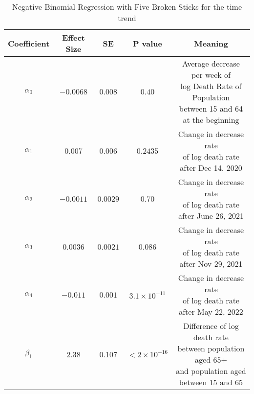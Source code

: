 \documentclass[12pt]{article}
\begin{document}
\begin{enumerate}[(a)]
	
	\begin{table}[htbp]
		\centering
		\begin{tabular}{ccccc}
			\toprule
			Coefficient & Effect Size & SE & P value & Meaning\\
			\midrule
			$\alpha_{0}$ & $-0.0068$ & $0.008$ & $0.40$ & \makecell{Average decrease per week of \\ log Death Rate of  Population \\ between 15 and 64 \\ at the beginning}\\
			\addlinespace[0.3cm]
			$\alpha_{1}$ & $0.007$ & $0.006$ & $0.2435$& \makecell{Change in decrease rate \\ of log death rate\\ after Dec 14, 2020}\\
			\addlinespace[0.3cm]
			$\alpha_{2}$ & $-0.0011$ & $0.0029$ & $0.70$& \makecell{Change in decrease rate \\ of log death rate\\ after June 26, 2021}\\
			\addlinespace[0.3cm]
			$\alpha_{3}$ & $0.0036$ & $0.0021$ & $0.086$& \makecell{Change in decrease rate \\ of log death rate\\ after Nov 29, 2021}\\
			\addlinespace[0.3cm]
			$\alpha_{4}$ & $-0.011$ & $0.001$ & $3.1\times 10^{-11}$& \makecell{Change in decrease rate \\ of log death rate\\ after May 22, 2022}\\
			\addlinespace[0.3cm]
			$\beta_{1}$ & 2.38 & 0.107 & $<2\times 10^{-16}$ & \makecell{Difference of log death rate \\between population aged 65+ \\ and population aged between 15 and 65}\\
			\bottomrule
		\end{tabular}
		\caption{Negative Binomial Regression with Five Broken Sticks for the time trend}\label{sticknb}
	\end{table}
\end{enumerate}
\end{document}
